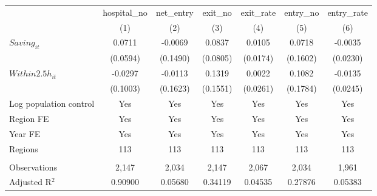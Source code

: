 \begingroup
\centering
\begin{tabular}{lcccccc}
   \toprule
                          & hospital\_no  & net\_entry  & exit\_no  & exit\_rate  & entry\_no  & entry\_rate \\    
                          & (1)           & (2)         & (3)       & (4)         & (5)        & (6)\\  
   \midrule 
   $Saving_{it}$          & 0.0711        & -0.0069     & 0.0837    & 0.0105      & 0.0718     & -0.0035\\   
                          & (0.0594)      & (0.1490)    & (0.0805)  & (0.0174)    & (0.1602)   & (0.0230)\\   
   $Within2.5h_{it}$      & -0.0297       & -0.0113     & 0.1319    & 0.0022      & 0.1082     & -0.0135\\   
                          & (0.1003)      & (0.1623)    & (0.1551)  & (0.0261)    & (0.1784)   & (0.0245)\\   
   Log population control & Yes           & Yes         & Yes       & Yes         & Yes        & Yes\\  
   Region FE              & Yes           & Yes         & Yes       & Yes         & Yes        & Yes\\  
   Year FE                & Yes           & Yes         & Yes       & Yes         & Yes        & Yes\\  
   Regions                & 113           & 113         & 113       & 113         & 113        & 113\\  
    \\
   Observations           & 2,147         & 2,034       & 2,147     & 2,067       & 2,034      & 1,961\\  
   Adjusted R$^2$         & 0.90900       & 0.05680     & 0.34119   & 0.04535     & 0.27876    & 0.05383\\  
   \bottomrule
\end{tabular}
\par\endgroup
